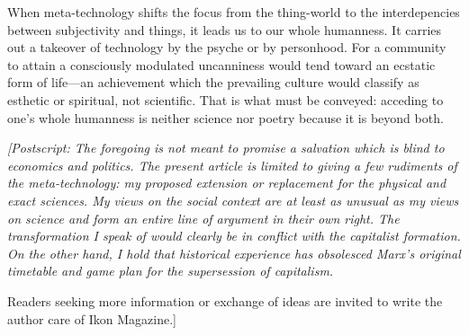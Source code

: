 When meta-technology shifts the focus from the thing-world to the interdepencies between subjectivity and things, it leads us to our whole humanness. It carries out a takeover of technology by the psyche or by personhood. For a community to attain a consciously modulated uncanniness would tend toward an ecstatic form of life---an achievement which the prevailing culture would classify as esthetic or spiritual, not scientific. That is what must be conveyed: acceding to one's whole humanness is neither science nor poetry because it is beyond both. 

\clearpage

\null\vfill

{\itshape [Postscript: The foregoing is not meant to promise a salvation which is blind to economics and politics. The present article is limited to giving a few rudiments of the meta-technology: my proposed extension or replacement for the physical and exact sciences. My views on the social context are at least as unusual as my views on science and form an entire line of argument in their own right. The transformation I speak of would clearly be in conflict with the capitalist formation. On the other hand, I hold that historical experience has obsolesced Marx's original timetable and game plan for the supersession of capitalism. 

Readers seeking more information or exchange of ideas are invited to write the author care of Ikon Magazine.]}
